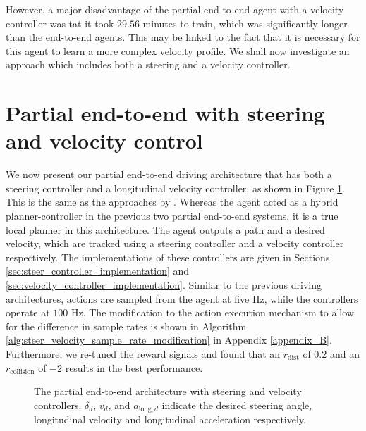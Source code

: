 However, a major disadvantage of the partial end-to-end agent with a velocity controller was tat it took  $29.56$ minutes to train, which was significantly longer than the end-to-end agents.
This may be linked to the fact that it is necessary for this agent to learn a more complex velocity profile.
We shall now investigate an approach which includes both a steering and a velocity controller.

%     

\section{Partial end-to-end with steering and velocity control}
We now present our partial end-to-end driving architecture that has both a steering controller and a longitudinal velocity controller, as shown in Figure \ref{fig:steer_vel_architecture}.
This is the same as the approaches by \cite{Capo2020, Moghadam2020}.
Whereas the agent acted as a hybrid planner-controller in the previous two partial end-to-end systems, it is a true local planner in this architecture.
The agent outputs a path and a desired velocity, which are tracked using a steering controller and a velocity controller respectively.
The implementations of these controllers are given in Sections \ref{sec:steer_controller_implementation} and \ref{sec:velocity_controller_implementation}.
Similar to the previous driving architectures, actions are sampled from the agent at five Hz, while the controllers operate at $100$ Hz.
The modification to the action execution mechanism to allow for the difference in sample rates is shown in Algorithm \ref{alg:steer_velocity_sample_rate_modification} in Appendix \ref{appendix_B}.
Furthermore, we re-tuned the reward signals and found that an $r_{\text{dist}}$ of $0.2$ and an $r_{\text{collision}}$ of $-2$ results in the best performance.

\begin{figure}[htb!]
    \centering
    
    \caption[The partial end-to-end architecture with steering and velocity controllers]{The partial end-to-end architecture with steering and velocity controllers. $\delta_{d}$, $v_{d}$, and $a_{\text{long},d}$ indicate the desired steering angle, longitudinal velocity and longitudinal acceleration respectively.}
    \label{fig:steer_vel_architecture}
\end{figure}

